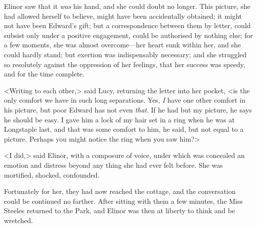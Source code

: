 Elinor saw that it \textit{was} his hand, and she could doubt no longer. This picture, she had allowed herself to believe, might have been accidentally obtained; it might not have been Edward's gift; but a correspondence between them by letter, could subsist only under a positive engagement, could be authorised by nothing else; for a few moments, she was almost overcome—her heart sunk within her, and she could hardly stand; but exertion was indispensably necessary; and she struggled so resolutely against the oppression of her feelings, that her success was speedy, and for the time complete.

<Writing to each other,> said Lucy, returning the letter into her pocket, <is the only comfort we have in such long separations. Yes, \textit{I} have one other comfort in his picture, but poor Edward has not even \textit{that}. If he had but my picture, he says he should be easy. I gave him a lock of my hair set in a ring when he was at Longstaple last, and that was some comfort to him, he said, but not equal to a picture. Perhaps you might notice the ring when you saw him?>

<I did,> said Elinor, with a composure of voice, under which was concealed an emotion and distress beyond any thing she had ever felt before. She was mortified, shocked, confounded.

Fortunately for her, they had now reached the cottage, and the conversation could be continued no farther. After sitting with them a few minutes, the Miss Steeles returned to the Park, and Elinor was then at liberty to think and be wretched.